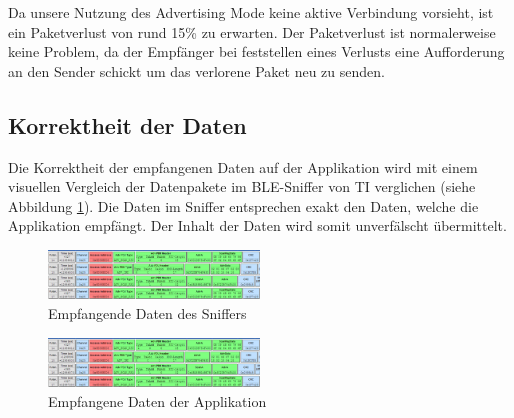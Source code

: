 Da unsere Nutzung des Advertising Mode keine aktive Verbindung vorsieht, ist ein Paketverlust von rund 15\thinspace\% zu erwarten. Der Paketverlust ist normalerweise keine Problem, da der Empfänger bei feststellen eines Verlusts eine Aufforderung an den Sender schickt um das verlorene Paket neu zu senden. 

\subsection{Korrektheit der Daten}

Die Korrektheit der empfangenen Daten auf der Applikation wird mit einem visuellen Vergleich der Datenpakete im BLE-Sniffer von TI verglichen (siehe Abbildung \ref{sniffer}).  Die Daten im Sniffer entsprechen exakt den Daten, welche die Applikation empfängt. Der Inhalt der Daten wird somit unverfälscht übermittelt.



\begin{figure}[ht]
    \includegraphics[width=0.5\textwidth]{4Resultate/imag/sniffer.png} 
    \caption{Empfangende Daten des Sniffers}
    \label{sniffer}
\end{figure}

\begin{figure}[ht]
    \includegraphics[width=0.5\textwidth]{4Resultate/imag/sniffer.png} 
    \caption{Empfangene Daten der Applikation}
    \label{applikation_daten}
\end{figure}








